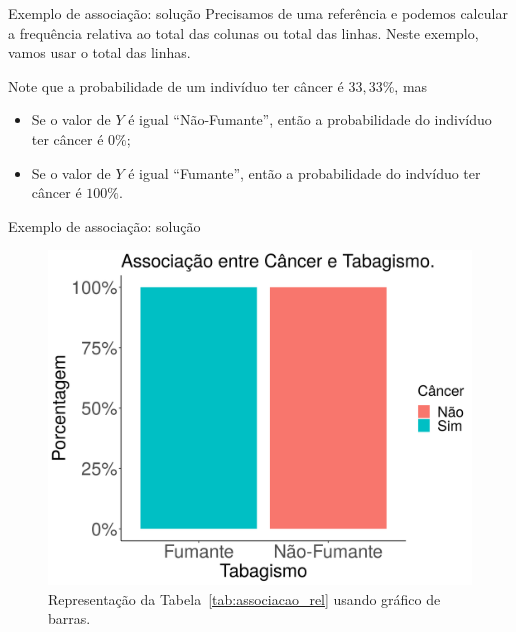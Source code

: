 \documentclass[9pt]{beamer}
\begin{document}
\begin{frame}{Exemplo de associação: solução}
Precisamos de uma referência e podemos calcular a frequência relativa ao total das colunas ou total das linhas. Neste exemplo, vamos usar o total das linhas.
\begin{table}[htbp]
	\centering
	\caption{Tabela de contingência com frequência relativa ao total das linhas.}
	\label{tab:associacao_rel}
\end{table} 

Note que a probabilidade de um indivíduo ter câncer é {\color{red} $33,33\%$}, mas
\begin{itemize}
	\item Se o valor de $Y$ é igual ``Não-Fumante'', então a probabilidade do indivíduo ter câncer é {\color{brown} $0\%$};
	\item Se o valor de $Y$ é igual ``Fumante'', então a probabilidade do indvíduo ter câncer é {\color{blue} $100\%$}.
\end{itemize}

\end{frame}

\begin{frame}{Exemplo de associação: solução}

\begin{figure}[htbp]
	\centering
	\includegraphics[width = 0.75\linewidth]{figures/associacao.png}
	\caption{Representação da Tabela~\ref{tab:associacao_rel} usando gráfico de barras.}
	\label{tab:graph-associacao}
\end{figure}
\end{frame}
\end{document}
